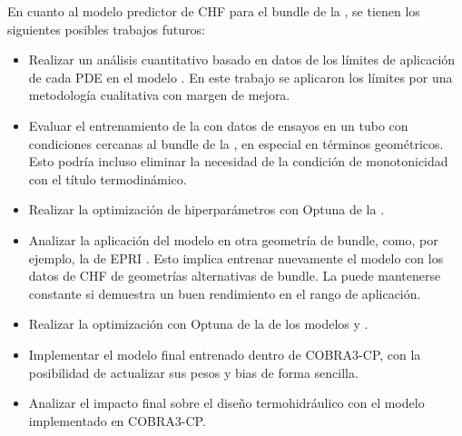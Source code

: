 En cuanto al modelo predictor de CHF para el bundle de la \cna{}, se tienen los siguientes posibles trabajos futuros:
\begin{itemize}
    \item Realizar un análisis cuantitativo basado en datos de los límites de aplicación de cada PDE en el modelo \mfpinn{}. En este trabajo se aplicaron los límites por una metodología cualitativa con margen de mejora.
    \item Evaluar el entrenamiento de la \lfpinn{} con datos de ensayos en un tubo con condiciones cercanas al bundle de la \cna{}, en especial en términos geométricos. Esto podría incluso eliminar la necesidad de la condición de monotonicidad con el título termodinámico.
    \item Realizar la optimización de hiperparámetros con Optuna de la \lfpinn{}.
    \item Analizar la aplicación del modelo en otra geometría de bundle, como, por ejemplo, la de EPRI \citep{EPRI1982}. Esto implica entrenar nuevamente el modelo con los datos de CHF de geometrías alternativas de bundle. La \lfpinn{} puede mantenerse constante si demuestra un buen rendimiento en el rango de aplicación.
    \item Realizar la optimización con Optuna de la \hfdnn{} de los modelos \mfdnn{} y \mfpinn{}.
    \item Implementar el modelo final entrenado dentro de COBRA3-CP, con la posibilidad de actualizar sus pesos y bias de forma sencilla.
    \item Analizar el impacto final sobre el diseño termohidráulico con el modelo \mfpinn{} implementado en COBRA3-CP.
\end{itemize}

